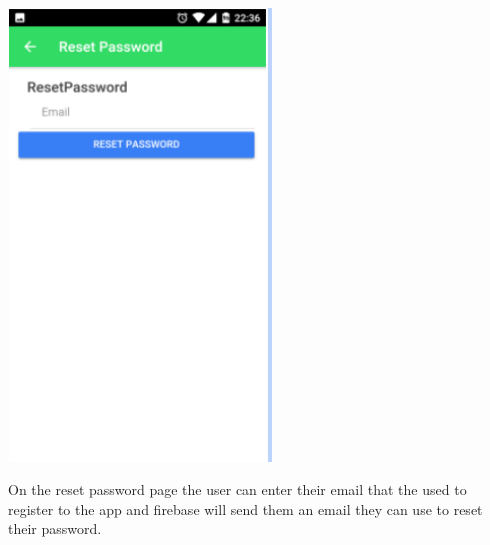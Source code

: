 \begin{center}    
	\includegraphics[width=7cm, height=12cm]{img/resetpassword.png}
\end{center}

On the reset password page the user can enter their email that the used to register to the app and firebase will send them an email they can use to reset their password.

